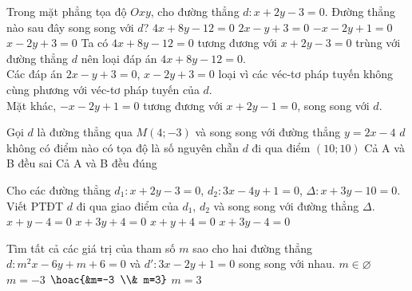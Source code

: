 	\begin{ex}%
		Trong mặt phẳng tọa độ $Oxy$, cho đường thẳng $d \colon x+2y-3=0$. Đường thẳng nào sau đây song song với $d$?
		\choice
		{$4x+8y-12=0$}
		{$2x-y+3=0$}
		{\True $-x-2y+1=0$}
		{$x-2y+3=0$}
		\loigiai
		{
			Ta có $4x+8y-12=0$ tương đương với $x+2y-3=0$ trùng với đường thẳng $d$ nên loại đáp án $4x+8y-12=0$.\\
			Các đáp án $2x-y+3=0$, $x-2y+3=0$ loại vì các véc-tơ pháp tuyến không cùng phương với véc-tơ pháp tuyến của $d$.\\
			Mặt khác, $-x-2y+1=0$ tương đương với $x+2y-1=0$, song song với $d$.
		}
	\end{ex}
	\begin{ex}%
		Gọi $d$ là đường thẳng qua $M(4;-3)$ và song song với đường thẳng $y=2x-4$
		\choice
		{\True $d$ không có điểm nào có tọa độ là số nguyên chẵn}
		{$d$ đi qua điểm $(10;10)$}
		{Cả A và B đều sai}
		{Cả A và B đều đúng}
	\end{ex}
	\begin{ex}%
		Cho các đường thẳng  $d_1 \colon x+2y-3=0$, $d_2 \colon 3x-4y+1=0$, $\Delta \colon x+3y-10=0$. Viết PTĐT $d$ đi qua giao điểm của $d_1$, $d_2$ và song song với đường thẳng $\Delta$.
		\choice
		{$x+y-4=0$}
		{$x+3y+4=0$}
		{$x+y+4=0$}
		{\True $x+3y-4=0$}
	\end{ex}
	\begin{ex}%
		Tìm tất cả các giá trị của tham số $m$ sao cho hai đường thẳng $d \colon m^2x-6y+m+6=0$ và $d' \colon 3x-2y+1=0$ song song với nhau.
		\choice
		{$m \in \varnothing$}
		{$m=-3$}
		{$\hoac{&m=-3 \\& m=3}$}
		{\True $m=3$}
	\end{ex}
